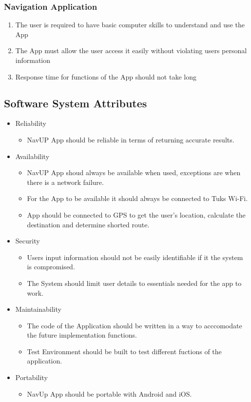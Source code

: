 \documentclass[a4paper, 12pt, one column, aas_macros]{article}
\begin{document}
\subsubsection{Navigation Application}
\begin{enumerate}
\item The user is required to have basic computer skills to understand and use the App
\item The App must allow the user access it easily without violating users personal information 
\item Response time for functions of the App should not take long
\end{enumerate}

\subsection{Software System Attributes}
 \begin{itemize}
 
\item Reliability
\begin{itemize}
\item NavUP App should be reliable in terms of returning accurate results.
\end{itemize} 


\item Availability
\begin{itemize}
\item NavUP App shoud always be available when used, exceptions are when there is a network failure.
\item For the App to be available it should always be connected to Tuks Wi-Fi.
\item App should be connected to GPS to get the user's location, calculate the destination and determine shorted route.
\end{itemize} 

\item Security
\begin{itemize}
\item Users input information should not be easily identifiable if it the system is compromised.
\item The System should limit user details to essentials needed for the app to work. 
\end{itemize} 

\item Maintainability
\begin{itemize}
\item The code of the Application should be written in a way to acccomodate the future implementation functions.
\item Test Environment should be built to test different fuctions of the application.
\end{itemize} 

\item Portability 
\begin{itemize}
\item NavUp App should be portable with Android and iOS.
\end{itemize} 
\end{itemize} 
\end{document}
